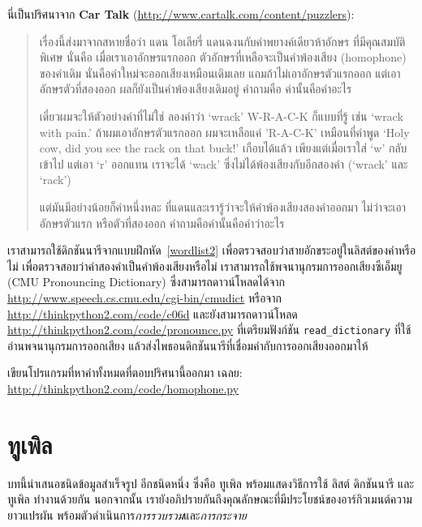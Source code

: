 \begin{exercise}

นี่เป็นปริศนาจาก \textbf{Car Talk} 
(\url{http://www.cartalk.com/content/puzzlers}):

\begin{quote}
เรื่องนี้ส่งมาจากสหายชื่อว่า แดน โอเลียรี่
แดนฉงนกับคำพยางค์เดียวห้าอักษร ที่มีคุณสมบัติพิเศษ
นั่นคือ เมื่อเราเอาอักษรแรกออก ตัวอักษรที่เหลือจะเป็นคำพ้องเสียง (homophone) ของคำเดิม นั่นคือคำใหม่จะออกเสียงเหมือนเดิมเลย
แถมถ้าไม่เอาอักษรตัวแรกออก แต่เอาอักษรตัวที่สองออก
ผลก็ยังเป็นคำพ้องเสียงเดิมอยู่
คำถามคือ คำนั้นคือคำอะไร

เดี๋ยวผมจะให้ตัวอย่างคำที่ไม่ใช่ 
ลองคำว่า `wrack' W-R-A-C-K ก็แบบที่รู้ เช่น `wrack with
pain.' 
ถ้าผมเอาอักษรตัวแรกออก ผมจะเหลือแค่ 'R-A-C-K' เหมือนที่คำพูด `Holy cow, did you see the rack on that buck!'
เกือบได้แล้ว 
เพียงแต่เมื่อเราใส่ `w' กลับเข้าไป แต่เอา `r' ออกแทน
เราจะได้ `wack' ซึ่งไม่ได้พ้องเสียงกับอีกสองคำ (`wrack' และ `rack')

แต่มันมีอย่างน้อยก็คำหนึ่งหละ ที่แดนและเรารู้ว่าจะให้คำพ้องเสียงสองคำออกมา 
ไม่ว่าจะเอาอักษรตัวแรก หรือตัวที่สองออก คำถามคือคำนั้นคือคำว่าอะไร
\end{quote}

เราสามารถใช้ดิกชันนารีจากแบบฝึกหัด~\ref{wordlist2} 
เพื่อตรวจสอบว่าสายอักขระอยู่ในลิสต์ของคำหรือไม่
เพื่อตรวจสอบว่าคำสองคำเป็นคำพ้องเสียงหรือไม่
เราสามารถใช้พจนานุกรมการออกเสียงซีเอ็มยู (CMU
Pronouncing Dictionary)
ซึ่งสามารถดาวน์โหลดได้จาก
\url{http://www.speech.cs.cmu.edu/cgi-bin/cmudict} 
หรือจาก
\url{http://thinkpython2.com/code/c06d} 
และยังสามารถดาวน์โหลด
\url{http://thinkpython2.com/code/pronounce.py}
ที่เตรียมฟังก์ชัน \verb"read_dictionary" ที่ใช้อ่านพจนานุกรมการออกเสียง
แล้วส่งไพธอนดิกชันนารีที่เชื่อมคำกับการออกเสียงออกมาให้

เขียนโปรแกรมที่หาคำทั้งหมดที่ตอบปริศนานี้ออกมา
เฉลย: \url{http://thinkpython2.com/code/homophone.py}

\end{exercise}
\vspace{0.5cm}



\chapter{ทูเพิล}
\label{tuplechap}

บทนี้นำเสนอชนิดข้อมูลสำเร็จรูป อีกชนิดหนึ่ง ซึ่งคือ ทูเพิล
พร้อมแสดงวิธีการใช้ ลิสต์ ดิกชันนารี และทูเพิล ทำงานด้วยกัน
%
%
นอกจากนั้น เรายังอภิปรายกันถึงคุณลักษณะที่มีประโยชน์ของอาร์กิวเมนต์ความยาวแปรผัน
พร้อมตัวดำเนินการ\textit{การรวบรวม}และ\textit{การกระจาย} 

